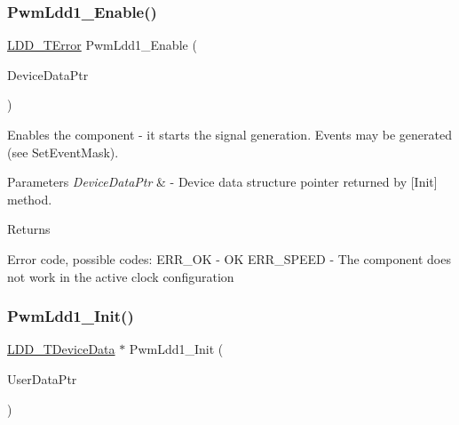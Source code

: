 \subsubsection{\texorpdfstring{Pwm\+Ldd1\+\_\+\+Enable()}{PwmLdd1\_Enable()}}
{\footnotesize\ttfamily \hyperlink{group___p_e___types__module_ga24c2b045fd04e79e85f261ce4df35588}{L\+D\+D\+\_\+\+T\+Error} Pwm\+Ldd1\+\_\+\+Enable (\begin{DoxyParamCaption}\item[{\hyperlink{group___p_e___types__module_gac5cf1362f1f0e3a2ce71b1bf2276d091}{L\+D\+D\+\_\+\+T\+Device\+Data} $\ast$}]{Device\+Data\+Ptr }\end{DoxyParamCaption})}



Enables the component -\/ it starts the signal generation. Events may be generated (see Set\+Event\+Mask). 


\begin{DoxyParams}{Parameters}
{\em Device\+Data\+Ptr} & -\/ Device data structure pointer returned by \mbox{[}Init\mbox{]} method. \\
\hline
\end{DoxyParams}
\begin{DoxyReturn}{Returns}

\begin{DoxyItemize}
\item Error code, possible codes\+: E\+R\+R\+\_\+\+OK -\/ OK E\+R\+R\+\_\+\+S\+P\+E\+ED -\/ The component does not work in the active clock configuration 
\end{DoxyItemize}
\end{DoxyReturn}
\mbox{\label{group___pwm_ldd1__module_ga275bfbba3cebf17ba3f7ca816cb83da4}} 
\subsubsection{\texorpdfstring{Pwm\+Ldd1\+\_\+\+Init()}{PwmLdd1\_Init()}}
{\footnotesize\ttfamily \hyperlink{group___p_e___types__module_gac5cf1362f1f0e3a2ce71b1bf2276d091}{L\+D\+D\+\_\+\+T\+Device\+Data} $\ast$ Pwm\+Ldd1\+\_\+\+Init (\begin{DoxyParamCaption}\item[{\hyperlink{group___p_e___types__module_ga0b66a73f87238a782318aa0be7578e35}{L\+D\+D\+\_\+\+T\+User\+Data} $\ast$}]{User\+Data\+Ptr }\end{DoxyParamCaption})}



